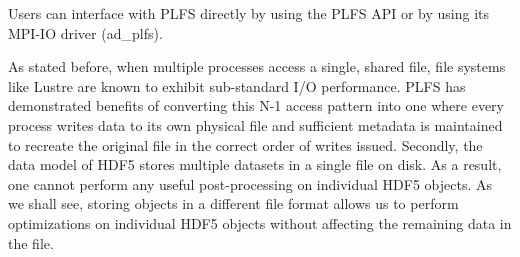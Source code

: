 Users can interface with PLFS directly by using the PLFS API or by using its MPI-IO driver (ad\_plfs).  

As stated before, when multiple processes access a single, shared file, file systems like Lustre are known to exhibit sub-standard I/O performance. PLFS has demonstrated benefits of converting this N-1 access pattern into one where every process writes data to its own physical file and sufficient metadata is maintained to recreate the original file in the correct order of writes issued. 
Secondly, the data model of HDF5 stores multiple datasets in a single file on disk. As a result, one cannot perform any useful post-processing on individual HDF5 objects. As we shall see, storing objects in a different file format allows us to perform optimizations on individual HDF5 objects without affecting the remaining data in the file.

